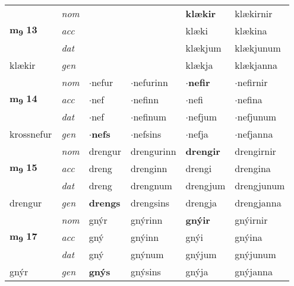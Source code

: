 \begin{longtable}[l]{llllll}
\multirow{3}{*}{{{\textbf{m{\textsubscript{9}}} \Large{\textbf{13}}}}}  & {\footnotesize{{\textit{nom}}}} &  &     & \textbf{klækir} & klækirnir  \\*
 &  {\footnotesize{{\textit{acc}}}} &   &    & klæki  & klækina \\*
 &  {\footnotesize{{\textit{dat}}}} &  &    & klækjum & klækjunum \\*
 {\footnotesize{klækir}} &   {\footnotesize{{\textit{gen}}}} & \textbf{}  &   & klækja & klækjanna \\
\cmidrule{1-6}


\multirow{3}{*}{{{\textbf{m{\textsubscript{9}}} \Large{\textbf{14}}}}}  & {\footnotesize{{\textit{nom}}}} & $\cdot$nefur & $\cdot$nefurinn    & \textbf{$\cdot$nefir} & $\cdot$nefirnir  \\*
 &  {\footnotesize{{\textit{acc}}}} & $\cdot$nef  & $\cdot$nefinn   & $\cdot$nefi  & $\cdot$nefina \\*
 &  {\footnotesize{{\textit{dat}}}} & $\cdot$nef & $\cdot$nefinum   & $\cdot$nefjum & $\cdot$nefjunum \\*
 {\footnotesize{krossnefur}} &   {\footnotesize{{\textit{gen}}}} & \textbf{$\cdot$nefs}  & $\cdot$nefsins  & $\cdot$nefja & $\cdot$nefjanna \\
\cmidrule{1-6}


\multirow{3}{*}{{{\textbf{m{\textsubscript{9}}} \Large{\textbf{15}}}}}  & {\footnotesize{{\textit{nom}}}} & drengur & drengurinn    & \textbf{drengir} & drengirnir  \\*
 &  {\footnotesize{{\textit{acc}}}} & dreng  & drenginn   & drengi  & drengina \\*
 &  {\footnotesize{{\textit{dat}}}} & dreng & drengnum   & drengjum & drengjunum \\*
 {\footnotesize{drengur}} &   {\footnotesize{{\textit{gen}}}} & \textbf{drengs}  & drengsins  & drengja & drengjanna \\
\cmidrule{1-6}


\multirow{3}{*}{{{\textbf{m{\textsubscript{9}}} \Large{\textbf{17}}}}}  & {\footnotesize{{\textit{nom}}}} & gnýr & gnýrinn    & \textbf{gnýir} & gnýirnir  \\*
 &  {\footnotesize{{\textit{acc}}}} & gný  & gnýinn   & gnýi  & gnýina \\*
 &  {\footnotesize{{\textit{dat}}}} & gný & gnýnum   & gnýjum & gnýjunum \\*
 {\footnotesize{gnýr}} &   {\footnotesize{{\textit{gen}}}} & \textbf{gnýs}  & gnýsins  & gnýja & gnýjanna \\
\cmidrule{1-6}



\end{longtable}
